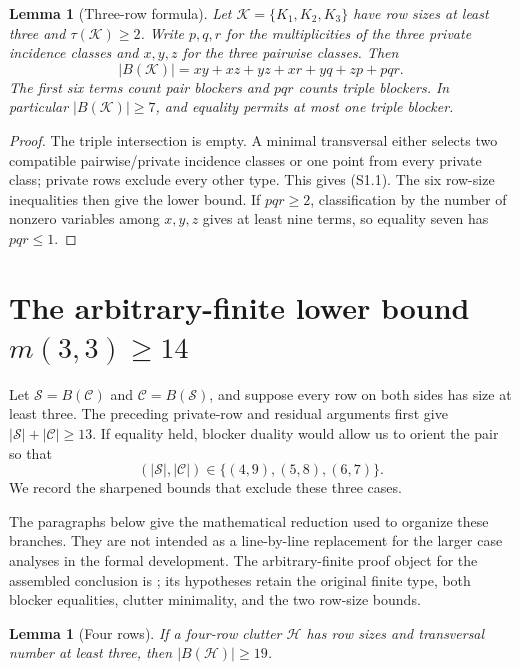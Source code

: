 \documentclass[11pt,a4paper]{article}
\newtheorem{lemma}[theorem]{Lemma}
\theoremstyle{definition}
\newcommand{\blocker}{B}
\begin{document}
\begin{lemma}[Three-row formula]
\label{lem:three-row}
Let $\mathcal K=\{K_1,K_2,K_3\}$ have row sizes at least three and
$\tau(\mathcal K)\geq2$.  Write $p,q,r$ for the multiplicities of the
three private incidence classes and $x,y,z$ for the three pairwise classes.
Then
\[
 |\blocker(\mathcal K)|
 =xy+xz+yz+xr+yq+zp+pqr.                 \tag{S1.1}
\]
The first six terms count pair blockers and $pqr$ counts triple blockers.
In particular $|\blocker(\mathcal K)|\geq7$, and equality permits at most
one triple blocker.
\end{lemma}

\begin{proof}
The triple intersection is empty.  A minimal transversal either selects two
compatible pairwise/private incidence classes or one point from every
private class; private rows exclude every other type.  This gives (S1.1).
The six row-size inequalities then give the lower bound.  If $pqr\geq2$,
classification by the number of nonzero variables among $x,y,z$ gives at
least nine terms, so equality seven has $pqr\leq1$.
\end{proof}

\section{The arbitrary-finite lower bound \texorpdfstring{$m(3,3)\geq14$}{m(3,3)>=14}}
\label{sec:m33-lower}

Let $\mathcal S=\blocker(\mathcal C)$ and
$\mathcal C=\blocker(\mathcal S)$, and suppose every row on both sides has
size at least three.  The preceding private-row and residual arguments first
give $|\mathcal S|+|\mathcal C|\geq13$.  If equality held, blocker duality
would allow us to orient the pair so that
\[
 (|\mathcal S|,|\mathcal C|)\in\{(4,9),(5,8),(6,7)\}.       \tag{S2.1}
\]
We record the sharpened bounds that exclude these three cases.

The paragraphs below give the mathematical reduction used to organize these
branches.  They are not intended as a line-by-line replacement for the larger
case analyses in the formal development.  The arbitrary-finite proof object
for the assembled conclusion is
; its hypotheses retain
the original finite type, both blocker equalities, clutter minimality, and the
two row-size bounds.

\begin{lemma}[Four rows]
\label{lem:four-nineteen}
If a four-row clutter $\mathcal H$ has row sizes and transversal number at
least three, then $|\blocker(\mathcal H)|\geq19$.
\end{lemma}
\end{document}
